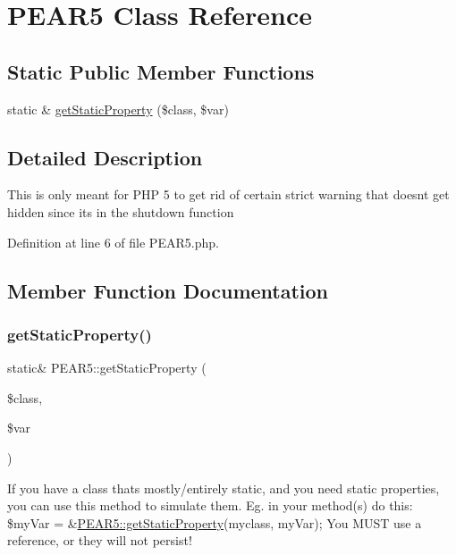 \hypertarget{classPEAR5}{}\section{P\+E\+A\+R5 Class Reference}
\label{classPEAR5}
\subsection*{Static Public Member Functions}
\begin{DoxyCompactItemize}
\item 
static \& \hyperlink{classPEAR5_a29ccb89d0bf8989788d0823c098325a6}{get\+Static\+Property} (\$class, \$var)
\end{DoxyCompactItemize}


\subsection{Detailed Description}
This is only meant for P\+HP 5 to get rid of certain strict warning that doesn\textquotesingle{}t get hidden since it\textquotesingle{}s in the shutdown function 

Definition at line 6 of file P\+E\+A\+R5.\+php.



\subsection{Member Function Documentation}
\hypertarget{classPEAR5_a29ccb89d0bf8989788d0823c098325a6}{}\label{classPEAR5_a29ccb89d0bf8989788d0823c098325a6} 
\subsubsection{\texorpdfstring{get\+Static\+Property()}{getStaticProperty()}}
{\footnotesize\ttfamily static\& P\+E\+A\+R5\+::get\+Static\+Property (\begin{DoxyParamCaption}\item[{}]{\$class,  }\item[{}]{\$var }\end{DoxyParamCaption})\hspace{0.3cm}{\ttfamily [static]}}

If you have a class that\textquotesingle{}s mostly/entirely static, and you need static properties, you can use this method to simulate them. Eg. in your method(s) do this\+: \$my\+Var = \&\hyperlink{classPEAR5_a29ccb89d0bf8989788d0823c098325a6}{P\+E\+A\+R5\+::get\+Static\+Property}(\textquotesingle{}myclass\textquotesingle{}, \textquotesingle{}my\+Var\textquotesingle{}); You M\+U\+ST use a reference, or they will not persist!

